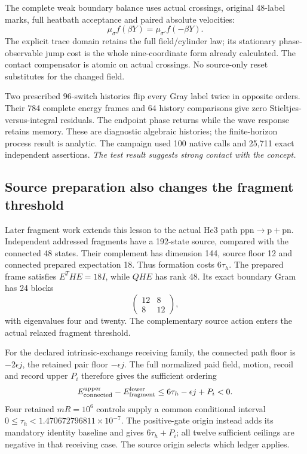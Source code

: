 The complete weak boundary balance uses actual crossings, original
48-label marks, full heatbath acceptance and paired absolute velocities:
\[
 \mu_\sigma f(\beta Y)=\mu_{\sigma'}f(-\beta Y).
\]
The explicit trace domain retains the full field/cylinder law; its
stationary phase-observable jump cost is the whole nine-coordinate form
already calculated. The contact compensator is atomic on actual
crossings. No source-only reset substitutes for the changed field.

Two prescribed 96-switch histories flip every Gray label twice in opposite
orders. Their 784 complete energy frames and 64 history comparisons give
zero Stieltjes-versus-integral residuals. The endpoint phase returns while
the wave response retains memory. These are diagnostic algebraic histories;
the finite-horizon process result is analytic. The campaign used 100 native
calls and 25,711 exact independent assertions. \emph{The test result
suggests strong contact with the concept.}

\subsection{Source preparation also changes the fragment threshold}

Later fragment work extends this lesson to the actual He3 path
\(\mathrm{ppn}\to\mathrm p+\mathrm{pn}\). Independent addressed fragments
have a 192-state source, compared with the connected 48 states. Their
complement has dimension 144, source floor 12 and connected prepared
expectation 18. Thus formation costs \(6\tau_h\). The prepared frame
satisfies \(E^THE=18I\), while \(QHE\) has rank 48. Its exact boundary
Gram has 24 blocks
\[
 \begin{pmatrix}12&8\\8&12\end{pmatrix},
\]
with eigenvalues four and twenty. The complementary source action enters
the actual relaxed fragment threshold.

For the declared intrinsic-exchange receiving family, the connected path
floor is \(-2\epsilon j\), the retained pair floor \(-\epsilon j\).
The full normalized paid field, motion, recoil and record upper \(P_i\)
therefore gives the sufficient ordering
\[
 E_{\rm connected}^{\rm upper}-E_{\rm fragment}^{\rm lower}
       \leq6\tau_h-\epsilon j+P_i<0.
\]
Four retained \(mR=10^6\) controls supply a common conditional interval
\(0\leq\tau_h<1.470672796811\times10^{-7}\). The positive-gate origin
instead adds its mandatory identity baseline and gives \(6\tau_h+P_i\);
all twelve sufficient ceilings are negative in that receiving case.
The source origin selects which ledger applies.

